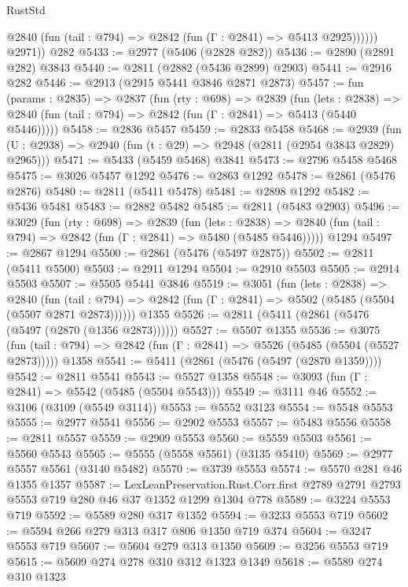 \begin{lexlean}{RustStd}
\begin{coremodule}
              @2840 (fun (tail : @794) => @2842 (fun (Γ : @2841) => @5413 @2925))))))
        @2971))
    @282
@5433 := @2977 (@5406 (@2828 @282))
@5436 := @2890 (@2891 @282) @3843
@5440 := @2811 (@2882 (@5436 @2899) @2903)
@5441 := @2916 @282
@5446 := @2913 (@2915 @5441 @3846 @2871 @2873)
@5457 := fun (params : @2835) =>
  @2837
    (fun (rty : @698) =>
    @2839
      (fun (lets : @2838) =>
      @2840 (fun (tail : @794) => @2842 (fun (Γ : @2841) => @5413 (@5440 @5446)))))
@5458 := @2836 @5457
@5459 := @2833 @5458
@5468 := @2939 (fun (U : @2938) => @2940 (fun (t : @29) => @2948 (@2811 (@2954 @3843 @2829) @2965)))
@5471 := @5433 (@5459 @5468) @3841
@5473 := @2796 @5458 @5468
@5475 := @3026 @5457 @1292
@5476 := @2863 @1292
@5478 := @2861 (@5476 @2876)
@5480 := @2811 (@5411 @5478)
@5481 := @2898 @1292
@5482 := @5436 @5481
@5483 := @2882 @5482
@5485 := @2811 (@5483 @2903)
@5496 := @3029
    (fun (rty : @698) =>
    @2839
      (fun (lets : @2838) =>
      @2840 (fun (tail : @794) => @2842 (fun (Γ : @2841) => @5480 (@5485 @5446)))))
    @1294
@5497 := @2867 @1294
@5500 := @2861 (@5476 (@5497 @2875))
@5502 := @2811 (@5411 @5500)
@5503 := @2911 @1294
@5504 := @2910 @5503
@5505 := @2914 @5503
@5507 := @5505 @5441 @3846
@5519 := @3051
    (fun (lets : @2838) =>
    @2840
      (fun (tail : @794) => @2842 (fun (Γ : @2841) => @5502 (@5485 (@5504 (@5507 @2871 @2873))))))
    @1355
@5526 := @2811 (@5411 (@2861 (@5476 (@5497 (@2870 (@1356 @2873))))))
@5527 := @5507 @1355
@5536 := @3075
    (fun (tail : @794) => @2842 (fun (Γ : @2841) => @5526 (@5485 (@5504 (@5527 @2873)))))
    @1358
@5541 := @5411 (@2861 (@5476 (@5497 (@2870 @1359))))
@5542 := @2811 @5541
@5543 := @5527 @1358
@5548 := @3093 (fun (Γ : @2841) => @5542 (@5485 (@5504 @5543)))
@5549 := @3111 @46
@5552 := @3106 (@3109 (@5549 @3114))
@5553 := @5552 @3123
@5554 := @5548 @5553
@5555 := @2977 @5541
@5556 := @2902 @5553
@5557 := @5483 @5556
@5558 := @2811 @5557
@5559 := @2909 @5553
@5560 := @5559 @5503
@5561 := @5560 @5543
@5565 := @5555 (@5558 @5561) (@3135 @5410)
@5569 := @2977 @5557 @5561 (@3140 @5482)
@5570 := @3739 @5553
@5574 := @5570 @281 @46 @1355 @1357
@5587 := LexLeanPreservation.Rust.Corr.first
    @2789
    @2791
    @2793
    @5553
    @719
    @280
    @46
    @37
    @1352
    @1299
    @1304
    @778
@5589 := @3224 @5553 @719
@5592 := @5589 @280 @317 @1352
@5594 := @3233 @5553 @719
@5602 := @5594 @266 @279 @313 @317 @806 @1350 @719 @374
@5604 := @3247 @5553 @719
@5607 := @5604 @279 @313 @1350
@5609 := @3256 @5553 @719
@5615 := @5609 @274 @278 @310 @312 @1323 @1349
@5618 := @5589 @274 @310 @1323

\end{coremodule}
\end{lexlean}
